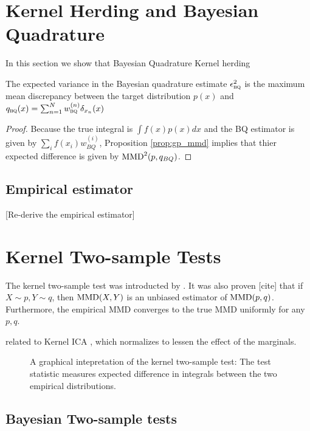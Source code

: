 \documentclass{article} %
\begin{document}
\section{Kernel Herding and Bayesian Quadrature}

In this section we show that Bayesian Quadrature Kernel herding \citep{chen2010super}

\begin{prop} The expected variance in the Bayesian quadrature estimate $\epsilon^{2}_{{\textsc{bq}}{}}$ is the maximum mean discrepancy between the target distribution $p(x)$ and $q_{{\textsc{bq}}{}}(x) = \sum_{n=1}^{N}w^{(n)}_{{\textsc{bq}}{}}\delta_{x_n}(x)$
\end{prop}
%
\begin{proof}
Because the true integral is $\int f(x) p(x) dx$ and the BQ estimator is given by $\sum_i f(x_i) w_{BQ}^{(i)}$,  Proposition \ref{prop:gp_mmd} implies that thier expected difference is given by ${\rm MMD}^2(p,q_{BQ})$.
\end{proof}

\subsection{Empirical estimator}

[Re-derive the empirical estimator]

\section{Kernel Two-sample Tests}

The kernel two-sample test was introducted by \cite{gretton2005kernel, gretton2008kernel}.  It was also proven [cite] that if $X \sim p, Y \sim q$, then ${\rm MMD}(X,Y)$ is an unbiased estimator of ${\rm MMD}(p,q)$.  Furthermore, the empirical MMD converges to the true MMD uniformly for any $p,q$.

related to Kernel ICA \cite{bach2003kernel}, which normalizes to lessen the effect of the marginals.

\begin{figure}
\caption{A graphical intepretation of the kernel two-sample test:  The test statistic measures expected difference in integrals between the two empirical distributions.}
\label{fig:ktst}
\end{figure}

\subsection{Bayesian Two-sample tests}
\end{document}

